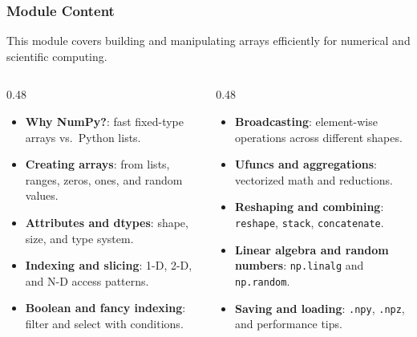 \documentclass[aspectratio=169,10pt]{beamer}
\newcommand{\keyword}[1]{\textcolor{PrimaryBlue}{\textbf{#1}}}
\newcommand{\codeword}[1]{\texttt{#1}}
\begin{document}
\begin{frame}
\frametitle{Module Content}
\small
This module covers building and manipulating arrays efficiently for numerical and scientific computing.

\vspace{0.16cm}
\begin{columns}[T,totalwidth=0.96\textwidth]
\begin{column}{0.48\textwidth}
\begin{itemize}\setlength\itemsep{0.08cm}
  \item \keyword{Why NumPy?}: fast fixed-type arrays vs.\ Python lists.
  \item \keyword{Creating arrays}: from lists, ranges, zeros, ones, and random values.
  \item \keyword{Attributes and dtypes}: shape, size, and type system.
  \item \keyword{Indexing and slicing}: 1-D, 2-D, and N-D access patterns.
  \item \keyword{Boolean and fancy indexing}: filter and select with conditions.
\end{itemize}
\end{column}
\begin{column}{0.48\textwidth}
\begin{itemize}\setlength\itemsep{0.08cm}
  \item \keyword{Broadcasting}: element-wise operations across different shapes.
  \item \keyword{Ufuncs and aggregations}: vectorized math and reductions.
  \item \keyword{Reshaping and combining}: \codeword{reshape}, \codeword{stack}, \codeword{concatenate}.
  \item \keyword{Linear algebra and random numbers}: \codeword{np.linalg} and \codeword{np.random}.
  \item \keyword{Saving and loading}: \codeword{.npy}, \codeword{.npz}, and performance tips.
\end{itemize}
\end{column}
\end{columns}
\end{frame}
\end{document}
